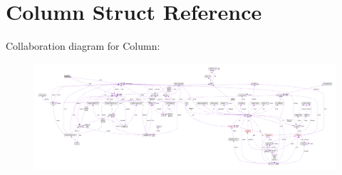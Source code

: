 \hypertarget{struct_column}{\section{Column Struct Reference}
\label{struct_column}
}


Collaboration diagram for Column\-:\nopagebreak
\begin{figure}[H]
\begin{center}
\leavevmode
\includegraphics[width=350pt]{struct_column__coll__graph}
\end{center}
\end{figure}
